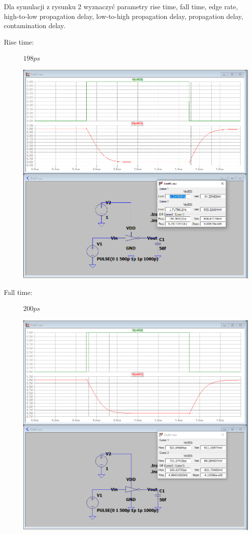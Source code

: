 \documentclass[a4paper, 11pt]{article}
\begin{document}
Dla symulacji z rysunku 2 wyznaczyć parametry rise time, fall time, edge rate, high-to-low propagation
delay, low-to-high propagation delay, propagation delay, contamination delay.

\begin{description}
	\item[Rise time:] $198 ps$ \hfill
	      \begin{center}
		      \includegraphics[scale=0.38]{mikro_lab3/rise_time.PNG}
	      \end{center}
	      \pagebreak
	\item[Fall time:] $200 ps$ \hfill
	      \begin{center}
		      \includegraphics[scale=0.38]{mikro_lab3/fall_time.PNG}

\end{center}
\end{description}
\end{document}
